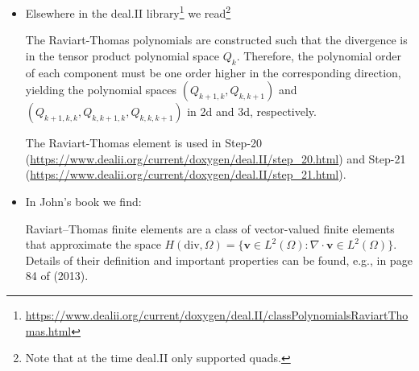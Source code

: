 \begin{itemize}
\begin{displayquote}
{Other properties of the Raviart-Thomas element are that 
(i) it is not a primitive element; (ii) the shape functions are defined so that 
certain integrals over the faces are 
either zero or one, rather than the common case of certain point values being 
either zero or one. 

We follow the commonly used - though confusing - definition of the ``degree'' of RT elements. 
Specifically, the ``degree'' of the element denotes the polynomial degree of the 
largest complete polynomial subspace contained in the finite element space, 
even if the space may contain shape functions of higher polynomial degree. 
The lowest order element is consequently FE\_RaviartThomas(0), i.e., 
the Raviart-Thomas element ``of degree zero'', even though the functions of this space 
are in general polynomials of degree one in each variable. This choice of ``degree'' 
implies that the approximation order of the function itself is degree+1, as with usual polynomial spaces. 
}
\end{displayquote}

\item 
Elsewhere in the deal.II library\footnote{\url{https://www.dealii.org/current/doxygen/deal.II/classPolynomialsRaviartThomas.html}} we read\footnote{Note that at the time deal.II only supported quads.}
\begin{displayquote}
{\color{darkgray}
The Raviart-Thomas polynomials are constructed such that the divergence is 
in the tensor product polynomial space $Q_k$. Therefore, the polynomial order of each component 
must be one order higher in the corresponding direction, yielding the polynomial spaces 
$(Q_{k+1,k}, Q_{k,k+1})$ and $(Q_{k+1,k,k}, Q_{k,k+1,k}, Q_{k,k,k+1})$ in 2d and 3d, respectively. 
}
\end{displayquote}

The Raviart-Thomas element is used in Step-20 (\url{https://www.dealii.org/current/doxygen/deal.II/step_20.html}) and Step-21 (\url{https://www.dealii.org/current/doxygen/deal.II/step_21.html}).


\item
In John's book \cite{john16} we find:
\begin{displayquote}
{\color{darkgray}
Raviart–Thomas finite elements are a class of vector-valued finite elements that approximate the space
$H(\text{div},\Omega)=\{ {\bm v} \in L^2(\Omega): \nabla \cdot {\bm v} \in L^2(\Omega)  \}$.
Details of their definition and important properties can be
found, e.g., in page 84 of \textcite{bobf13} (2013).

}
\end{displayquote}
\end{itemize}
